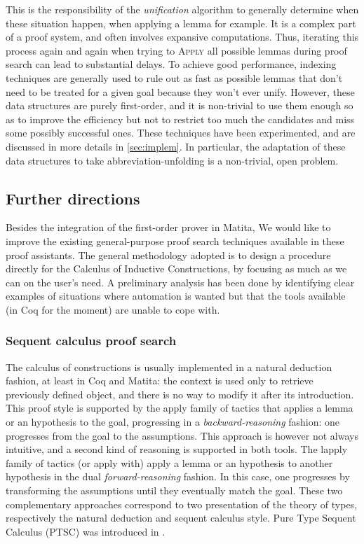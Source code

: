 \documentclass[twoside,a4paper,12pt]{article}
\begin{document}
This is the responsibility of the \emph{unification} algorithm to
generally determine when these situation happen, when applying a lemma
for example. It is a complex part of a proof system, and often
involves expansive computations. Thus, iterating this process again
and again when trying to \textsc{Apply} all possible lemmas during
proof search can lead to substantial delays. To achieve good
performance, indexing techniques are generally used to rule out as
fast as possible lemmas that don't need to be treated for a given goal
because they won't ever unify. However, these data structures are
purely first-order, and it is non-trivial to use them enough so as to
improve the efficiency but not to restrict too much the candidates and
miss some possibly successful ones. These techniques have been
experimented, and are discussed in more details in
\ref{sec:implem}. In particular, the adaptation of these
data structures to take abbreviation-unfolding is a non-trivial, open
problem.

\subsection{Further directions}

Besides the integration of the first-order prover in \textsf{Matita},
We would like to improve the existing general-purpose proof search
techniques available in these proof assistants. The general
methodology adopted is to design a procedure directly for the Calculus
of Inductive Constructions, by focusing as much as we can on the
user's need. A preliminary analysis has been done by identifying clear
examples of situations where automation is wanted but that the tools
available (in \textsf{Coq} for the moment) are unable to cope with.

\subsubsection{Sequent calculus proof search}

The calculus of constructions is usually implemented in a natural
deduction fashion, at least in \textsf{Coq} and \textsf{Matita}: the
context is used only to retrieve previously defined object, and there
is no way to modify it after its introduction. This proof style is
supported by the \textsf{apply} family of tactics that applies a lemma
or an hypothesis to the goal, progressing in a
\emph{backward-reasoning} fashion: one progresses from the goal to the
assumptions. This approach is however not always intuitive, and a
second kind of reasoning is supported in both tools. The
\textsf{lapply} family of tactics (or \textsf{apply with}) apply a
lemma or an hypothesis to another hypothesis in the dual
\emph{forward-reasoning} fashion. In this case, one progresses by
transforming the assumptions until they eventually match the goal.
These two complementary approaches correspond to two presentation of
the theory of types, respectively the natural deduction and sequent
calculus style. Pure Type Sequent Calculus (PTSC) was introduced in
\cite{lengrand2006normalisation}.
\end{document}
